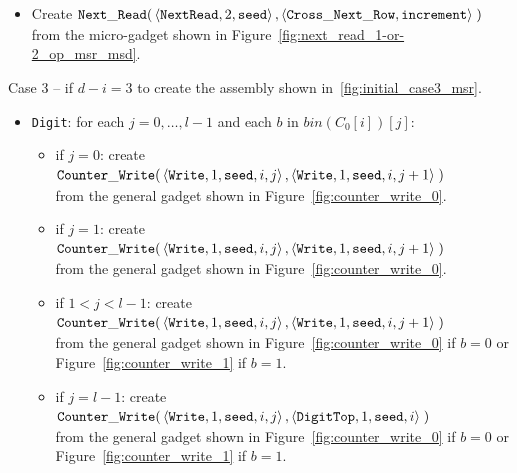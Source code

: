 \begin{itemize}
    \item Create
    $\begin{aligned}[t]
        {\tt Next\_Read}(& \left\langle {\tt NextRead}, 2,      {\tt seed}      \right\rangle,
                    \left\langle {\tt Cross\_Next\_Row}, {\tt increment} \right\rangle \;)
    \end{aligned}$\\from the micro-gadget shown in Figure~\ref{fig:next_read_1-or-2_op_msr_msd}.
\end{itemize}



Case 3 -- if $d - i = 3$ to create the assembly shown in~\ref{fig:initial_case3_msr}.
\begin{itemize}

    \item {\tt Digit}: for each $j=0,\ldots,l-1$ and each $b$ in $bin(C_0[i])[j]$:
    \begin{itemize}
        \item if $j = 0$: create
        $\begin{aligned}[t]
            {\tt Counter\_Write}(&\left\langle {\tt Write}, 1, {\tt seed}, i, j \right\rangle, \left\langle {\tt Write}, 1, {\tt seed}, i, j + 1 \right\rangle \;)
        \end{aligned}$\\from the general gadget shown in Figure~\ref{fig:counter_write_0}.

        \item if $j = 1$: create
        $\begin{aligned}[t]
            {\tt Counter\_Write}(&\left\langle {\tt Write}, 1, {\tt seed}, i, j \right\rangle, \left\langle {\tt Write}, 1, {\tt seed}, i, j + 1 \right\rangle \;)
        \end{aligned}$\\from the general gadget shown in Figure~\ref{fig:counter_write_0}.

        \item if $1 < j < l-1$: create
        $\begin{aligned}[t]
            {\tt Counter\_Write}(&\left\langle {\tt Write}, 1, {\tt seed}, i, j \right\rangle, \left\langle {\tt Write}, 1, {\tt seed}, i, j + 1 \right\rangle \;)
        \end{aligned}$\\from the general gadget shown in Figure~\ref{fig:counter_write_0} if $b = 0$ or Figure~\ref{fig:counter_write_1} if $b = 1$.

        \item if $j = l-1$: create
        $\begin{aligned}[t]
            {\tt Counter\_Write}(&\left\langle {\tt Write}, 1, {\tt seed}, i, j \right\rangle, \left\langle {\tt DigitTop}, 1, {\tt seed}, i \right\rangle \;)
        \end{aligned}$\\from the general gadget shown in Figure~\ref{fig:counter_write_0} if $b = 0$ or Figure~\ref{fig:counter_write_1} if $b = 1$.
    \end{itemize}



\end{itemize}
